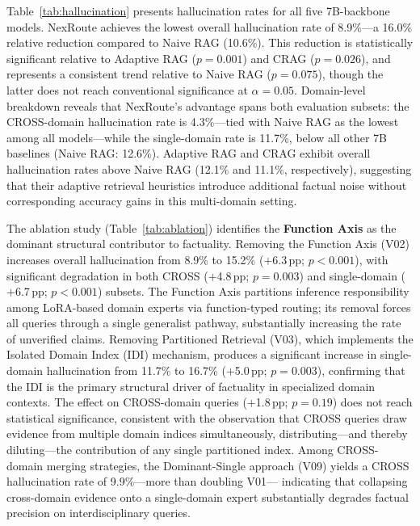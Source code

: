 \documentclass[a4paper,fleql]{cas-sc}
\begin{document}
Table~\ref{tab:hallucination} presents hallucination rates for all five
7B-backbone models.
NexRoute achieves the lowest overall hallucination rate of 8.9\%---a 16.0\%
relative reduction compared to Naive RAG (10.6\%).
This reduction is statistically significant relative to Adaptive RAG
($p{=}0.001$) and CRAG ($p{=}0.026$), and represents a consistent trend
relative to Naive RAG ($p{=}0.075$), though the latter does not reach
conventional significance at $\alpha{=}0.05$.
Domain-level breakdown reveals that NexRoute's advantage spans both evaluation
subsets: the CROSS-domain hallucination rate is 4.3\%---tied with Naive RAG
as the lowest among all models---while the single-domain rate is 11.7\%,
below all other 7B baselines (Naive RAG: 12.6\%).
Adaptive RAG and CRAG exhibit overall hallucination rates above Naive RAG
(12.1\% and 11.1\%, respectively), suggesting that their adaptive retrieval
heuristics introduce additional factual noise without corresponding accuracy
gains in this multi-domain setting.

The ablation study (Table~\ref{tab:ablation}) identifies the
\textbf{Function Axis} as the dominant structural contributor to factuality.
Removing the Function Axis (V02) increases overall hallucination from 8.9\%
to 15.2\% ($+$6.3\,pp; $p{<}0.001$), with significant degradation in both
CROSS ($+$4.8\,pp; $p{=}0.003$) and single-domain ($+$6.7\,pp; $p{<}0.001$)
subsets.
The Function Axis partitions inference responsibility among LoRA-based domain
experts via function-typed routing; its removal forces all queries through a
single generalist pathway, substantially increasing the rate of unverified
claims.
Removing Partitioned Retrieval (V03), which implements the Isolated Domain
Index (IDI) mechanism, produces a significant increase in single-domain
hallucination from 11.7\% to 16.7\% ($+$5.0\,pp; $p{=}0.003$), confirming
that the IDI is the primary structural driver of factuality in specialized
domain contexts.
The effect on CROSS-domain queries ($+$1.8\,pp; $p{=}0.19$) does not reach
statistical significance, consistent with the observation that CROSS queries
draw evidence from multiple domain indices simultaneously, distributing---and
thereby diluting---the contribution of any single partitioned index.
Among CROSS-domain merging strategies, the Dominant-Single approach (V09)
yields a CROSS hallucination rate of 9.9\%---more than doubling V01---
indicating that collapsing cross-domain evidence onto a single-domain expert
substantially degrades factual precision on interdisciplinary queries.
\end{document}

